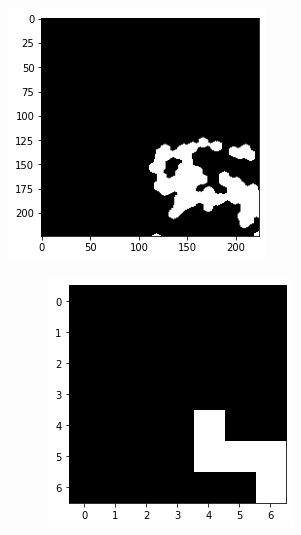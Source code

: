 \documentclass[10pt,twocolumn,hidelinks,letterpaper]{article}
\begin{document}
\begin{figure}
	\centering

	\begin{subfigure}{.4\linewidth}
		\includegraphics[width=\linewidth]{images/mmaps_example/downsampling224x224_bw.png}
	\end{subfigure}
  \begin{subfigure}{.59\linewidth}
    \begin{subfigure}{.325\linewidth}
  		\includegraphics[width=\linewidth]{images/mmaps_example/downsampling7x7_bw.png}

\end{subfigure}
\end{subfigure}
\end{figure}
\end{document}
